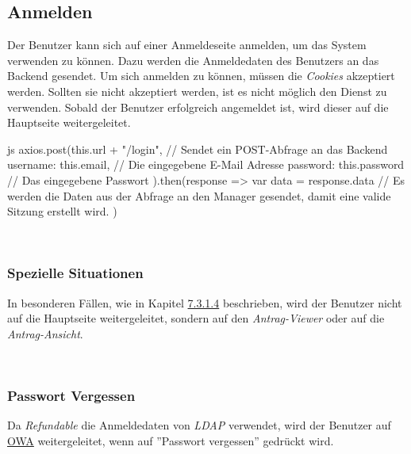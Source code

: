 \subsection{Anmelden}
Der Benutzer kann sich auf einer Anmeldeseite anmelden, um das System verwenden zu können. Dazu werden die Anmeldedaten des Benutzers an das Backend gesendet. Um sich anmelden zu können, müssen die \textit{Cookies} akzeptiert werden. Sollten sie nicht akzeptiert werden, ist es nicht möglich den Dienst zu verwenden.
Sobald der Benutzer erfolgreich angemeldet ist, wird dieser auf die Hauptseite weitergeleitet.
\\
\begin{code}{js}
axios.post(this.url + "/login", {	// Sendet ein POST-Abfrage an das Backend
	username: this.email,	// Die eingegebene E-Mail Adresse
	password: this.password // Das eingegebene Passwort
}).then(response => {
	var data = response.data
	// Es werden die Daten aus der Abfrage an den Manager gesendet, damit eine valide Sitzung erstellt wird.
})
\end{code}
~\\

\subsubsection{Spezielle Situationen}
In besonderen Fällen, wie in Kapitel \hyperref[sec:antrag_viewer]{7.3.1.4} beschrieben, wird der Benutzer nicht auf die Hauptseite weitergeleitet, sondern auf den \textit{Antrag-Viewer} oder auf die \textit{Antrag-Ansicht}.
~\\
\subsubsection{Passwort Vergessen}
Da \textit{Refundable} die Anmeldedaten von \textit{LDAP} verwendet, wird der Benutzer auf \href{https://owa.tgm.ac.at}{OWA} weitergeleitet, wenn auf ''Passwort vergessen'' gedrückt wird.
\newpage
